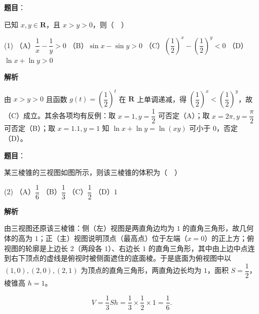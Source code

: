 \begin{answer}

\textbf{题目}：

已知 \(x,y\in\mathbf{R}\)，且 \(x>y>0\)，则（　）

\begin{gkopts}(1)
\task （A）\(\dfrac{1}{x}-\dfrac{1}{y}>0\)
\task （B）\(\sin x-\sin y>0\)
\task （C）\(\left(\dfrac{1}{2}\right)^{x}-\left(\dfrac{1}{2}\right)^{y}<0\)
\task （D）\(\ln x+\ln y>0\)
\end{gkopts}

\textbf{解析}

由 \(x>y>0\) 且函数 \(g(t)=\left(\dfrac12\right)^t\) 在 \(\mathbf R\) 上单调递减，得 \(\left(\dfrac12\right)^x<\left(\dfrac12\right)^y\)，故（C）成立。其余各项均有反例：取 \(x=1,y=\dfrac12\) 可否定（A）；取 \(x=2\pi,y=\dfrac{\pi}{2}\) 可否定（B）；取 \(x=1.1,y=1\) 知 \(\ln x+\ln y=\ln(xy)\) 可小于 \(0\)，否定（D）。


\end{answer}
\begin{answer}

\textbf{题目}：

某三棱锥的三视图如图所示，则该三棱锥的体积为（　）
\nopagebreak[4]
\begin{center}\end{center}
\nopagebreak[4]
\begin{gkopts}(2)
\task （A）\(\dfrac{1}{6}\)
\task （B）\(\dfrac{1}{3}\)
\task （C）\(\dfrac{1}{2}\)
\task （D）\(1\)
\end{gkopts}

\textbf{解析}

由三视图还原该三棱锥：侧（左）视图是两直角边均为 \(1\) 的直角三角形，故几何体的高为 \(1\)；正（主）视图说明顶点（最高点）位于左端（\(x=0\)）的正上方；俯视图的轮廓是上边长 \(2\)（两段各 \(1\)）、右边长 \(1\) 的直角三角形，其中由上边中点连到右下顶点的虚线是俯视时被侧面遮住的底面棱。于是底面为俯视图中以 \((1,0),(2,0),(2,1)\) 为顶点的直角三角形，两直角边长均为 \(1\)，面积 \(S=\dfrac12\)，棱锥高 \(h=1\)。

\nopagebreak[4]
\[
V=\frac13Sh=\frac13\times\frac12\times1=\frac16.
\]


\end{answer}
